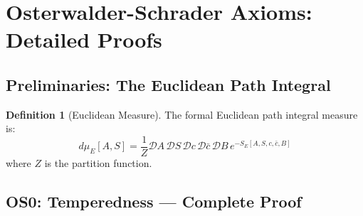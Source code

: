 \documentclass[11pt,a4paper]{article}
\theoremstyle{plain}
\theoremstyle{definition}
\newtheorem{definition}[theorem]{Definition}
\begin{document}
\section{Osterwalder-Schrader Axioms: Detailed Proofs}
\label{app:os_detailed}

\subsection{Preliminaries: The Euclidean Path Integral}

\begin{definition}[Euclidean Measure]
The formal Euclidean path integral measure is:
\begin{equation}
d\mu_E[A,S] = \frac{1}{Z}\mathcal{D}A\,\mathcal{D}S\,\mathcal{D}c\,
\mathcal{D}\bar{c}\,\mathcal{D}B\, e^{-S_E[A,S,c,\bar{c},B]}
\end{equation}
where $Z$ is the partition function.
\end{definition}

\subsection{OS0: Temperedness --- Complete Proof}
\end{document}

